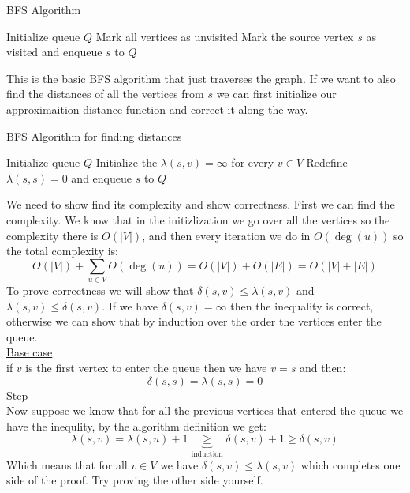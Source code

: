 \documentclass[11pt,a4paper]{article}
\begin{document}
\begin{algorithm}
  \caption{BFS Algorithm}
  Initialize queue $Q$\;
  Mark all vertices as unvisited\;
  Mark the source vertex $s$ as visited and enqueue $s$ to $Q$\;
\end{algorithm}

This is the basic BFS algorithm that just traverses the graph. If we
want to also find the distances of all the vertices from $s$ we can
first initialize our approximaition distance function and correct
it along the way.

\begin{algorithm}
  \caption{BFS Algorithm for finding distances}
  Initialize queue $Q$\;
  Initialize the $\lambda(s,v)=\infty$ for every $v\in V$\;
  Redefine $\lambda(s,s)=0$ and enqueue $s$ to $Q$\;
\end{algorithm}

\newpage

We need to show find its complexity and show correctness.
First we can find the complexity. We know that in the initizlization
we go over all the vertices so the complexity there is $O(|V|)$, and
then every iteration we do in $O(\deg(u))$ so the total complexity
is:
\[
  O(|V|) + \sum_{u\in V}{O(\deg(u))} = O(|V|) + O(|E|) = O(|V|+|E|)
\]
To prove correctness we will show that $\delta(s,v) \le \lambda(s,v)$ and 
$\lambda(s,v) \le \delta(s,v)$. If we have $\delta(s,v)=\infty$ then
the inequality is correct, otherwise we can show that by induction 
over the order the vertices enter the queue.\\
\underline{Base case} \\
if $v$ is the first vertex to enter the queue then we have $v=s$
and then:
\[
  \delta(s,s) = \lambda(s,s) = 0
\]
\underline{Step} \\
Now suppose we know that for all the previous vertices that entered
the queue we have the inequlity, by the algorithm definition we get:
\[
  \lambda(s,v) = \lambda(s,u) + 1 \underbrace{\geq}_{\text{induction}} 
  \delta(s,v) + 1 \geq \delta(s,v)
\]
Which means that for all $v\in V$ we have $\delta(s,v) \le \lambda(s,v)$
which completes one side of the proof. Try proving the other side
yourself.
\end{document}
